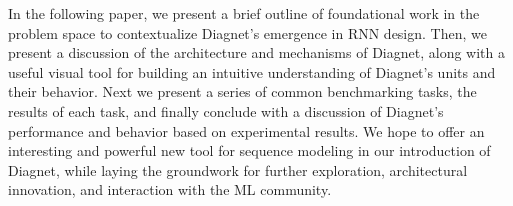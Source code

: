 \documentclass{article}
\begin{document}
In the following paper, we present a brief outline of foundational work in the problem space to contextualize Diagnet’s emergence in RNN design.  Then, we present a discussion of the architecture and mechanisms of Diagnet, along with a useful visual tool for building an intuitive understanding of Diagnet’s units and their behavior.  Next we present a series of common benchmarking tasks, the results of each task, and finally conclude with a discussion of Diagnet’s performance and behavior based on experimental results.  We hope to offer an interesting and powerful new tool for sequence modeling in our introduction of Diagnet, while laying the groundwork for further exploration, architectural innovation, and interaction with the ML community.

%
%
%
\end{document}
